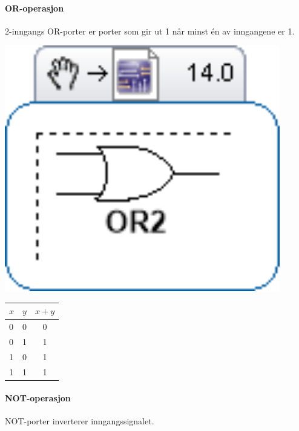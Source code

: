 \documentclass[11pt, a4paper, norwegian]{article}
\begin{document}
\paragraph{OR-operasjon}
2-inngangs OR-porter er porter som gir ut 1 når minst én av inngangene er 1. 

{\centering
\begin{minipage}{0.45\textwidth}
  \centering
  \includegraphics[width=0.9\textwidth]{port_or.png}
  \label{fig_or}
\end{minipage}
\begin{minipage}{0.45\textwidth}
  \centering
  \label{tbl_or}
  \begin{tabular}{|ll||c|}
        \hline
        $x$ & $y$ & $x+y$ \\ 	\hline
        0 & 0 & 0 \\
        0 & 1 & 1 \\
        1 & 0 & 1 \\
        1 & 1 & 1 \\ \hline
  \end{tabular}
\end{minipage}
\endgraf\bigskip
}

\paragraph{NOT-operasjon}
NOT-porter inverterer inngangssignalet. 
\end{document}
